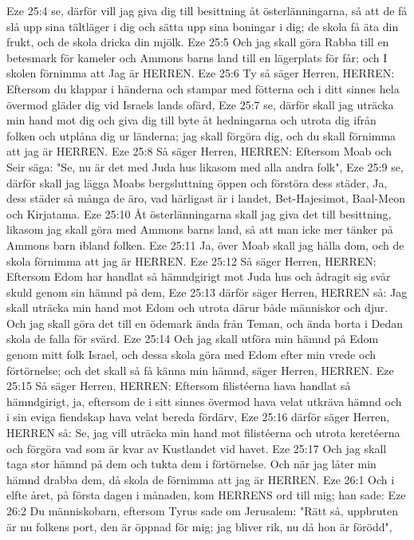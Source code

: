 Eze 25:4  se, därför vill jag giva dig till besittning åt österlänningarna, så att de få slå upp sina tältläger i dig och sätta upp sina boningar i dig; de skola få äta din frukt, och de skola dricka din mjölk.
Eze 25:5  Och jag skall göra Rabba till en betesmark för kameler och Ammons barns land till en lägerplats för får; och I skolen förnimma att Jag är HERREN.
Eze 25:6  Ty så säger Herren, HERREN: Eftersom du klappar i händerna och stampar med fötterna och i ditt sinnes hela övermod gläder dig vid Israels lands ofärd,
Eze 25:7  se, därför skall jag uträcka min hand mot dig och giva dig till byte åt hedningarna och utrota dig ifrån folken och utplåna dig ur länderna; jag skall förgöra dig, och du skall förnimma att jag är HERREN.
Eze 25:8  Så säger Herren, HERREN: Eftersom Moab och Seir säga: "Se, nu är det med Juda hus likasom med alla andra folk",
Eze 25:9  se, därför skall jag lägga Moabs bergsluttning öppen och förstöra dess städer, Ja, dess städer så många de äro, vad härligast är i landet, Bet-Hajesimot, Baal-Meon och Kirjatama.
Eze 25:10  Åt österlänningarna skall jag giva det till besittning, likasom jag skall göra med Ammons barns land, så att man icke mer tänker på Ammons barn ibland folken.
Eze 25:11  Ja, över Moab skall jag hålla dom, och de skola förnimma att jag är HERREN.
Eze 25:12  Så säger Herren, HERREN: Eftersom Edom har handlat så hämndgirigt mot Juda hus och ådragit sig svår skuld genom sin hämnd på dem,
Eze 25:13  därför säger Herren, HERREN så: Jag skall uträcka min hand mot Edom och utrota därur både människor och djur. Och jag skall göra det till en ödemark ända från Teman, och ända borta i Dedan skola de falla för svärd.
Eze 25:14  Och jag skall utföra min hämnd på Edom genom mitt folk Israel, och dessa skola göra med Edom efter min vrede och förtörnelse; och det skall så få känna min hämnd, säger Herren, HERREN.
Eze 25:15  Så säger Herren, HERREN: Eftersom filistéerna hava handlat så hämndgirigt, ja, eftersom de i sitt sinnes övermod hava velat utkräva hämnd och i sin eviga fiendskap hava velat bereda fördärv,
Eze 25:16  därför säger Herren, HERREN så: Se, jag vill uträcka min hand mot filistéerna och utrota keretéerna och förgöra vad som är kvar av Kustlandet vid havet.
Eze 25:17  Och jag skall taga stor hämnd på dem och tukta dem i förtörnelse. Och när jag låter min hämnd drabba dem, då skola de förnimma att jag är HERREN.
Eze 26:1  Och i elfte året, på första dagen i månaden, kom HERRENS ord till mig; han sade:
Eze 26:2  Du människobarn, eftersom Tyrus sade om Jerusalem: "Rätt så, uppbruten är nu folkens port, den är öppnad för mig; jag bliver rik, nu då hon är förödd",
